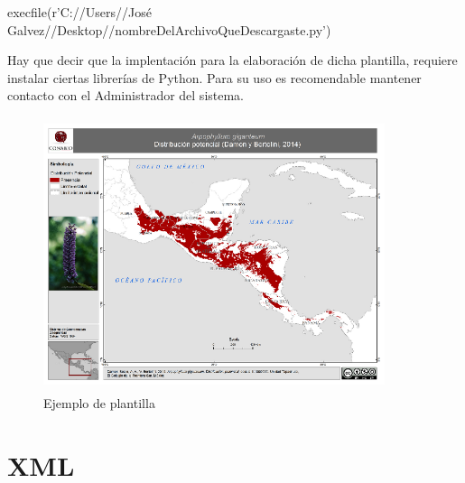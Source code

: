 \documentclass[twoside]{book}
\begin{document}
execfile(r'C://Users//José Galvez//Desktop//nombreDelArchivoQueDescargaste.py')

Hay que decir que la implentación para la elaboración de dicha plantilla, requiere instalar ciertas librerías de Python. Para su uso es recomendable mantener contacto con el Administrador del sistema.


\begin{figure}[h!] %
	\includegraphics[width=10cm, height=8cm]{img/plantilla} %
	\caption{Ejemplo de plantilla}
\end{figure}


\section{XML}
\end{document}
